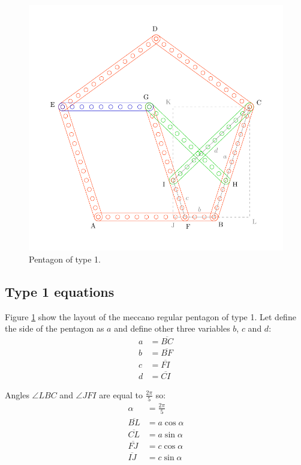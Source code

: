 \documentclass[11pt]{article}
\begin{document}
\begin{figure}[htpb]
\centering
\includegraphics[scale=1]{penta-type-1}
\caption{Pentagon of type 1.}
\label{fig:type-1}
\end{figure}

\subsection{Type 1 equations}

Figure \ref{fig:type-1} show the layout of the meccano regular pentagon of type 1.
Let define the side of the pentagon as $a$ and define other three variables $b$, $c$ and $d$:
\begin{align*}
a &= \overline{BC}\\
b &= \overline{BF}\\
c &= \overline{FI}\\
d &= \overline{CI}
\end{align*}

Angles $\angle{LBC}$ and $\angle{JFI}$ are equal to $\frac{2\pi}{5}$ so:
\begin{align*}
\alpha &= \frac{2\pi}{5}\\
\overline{BL} &= a\cos{\alpha}\\
\overline{CL} &= a\sin{\alpha}\\
\overline{FJ} &= c\cos{\alpha}\\
\overline{IJ} &= c\sin{\alpha}
\end{align*}
\end{document}
